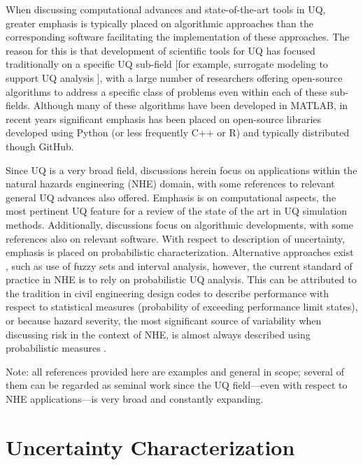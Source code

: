 When discussing computational advances and state-of-the-art tools in UQ, greater emphasis is typically placed on algorithmic approaches than the corresponding software facilitating the implementation of these approaches. The reason for this is that development of scientific tools for UQ has focused traditionally on a specific UQ sub-field [for example, surrogate modeling to support UQ analysis \citep{lophaven2002dacea, gorissen2010surrogate}], with a large number of researchers \citep[e.g.,][]{bect2017bayesian, clement2018methods} offering open-source algorithms to address a specific class of problems even within each of these sub-fields. Although many of these algorithms have been developed in MATLAB, in recent years significant emphasis has been placed on open-source libraries developed using Python (or less frequently C++ or R) and typically distributed though GitHub.    

Since UQ is a very broad field, discussions herein focus on applications within the natural hazards engineering (NHE) domain, with some references to relevant general UQ advances also offered. Emphasis is on computational aspects, the most pertinent UQ feature for a review of the state of the art in UQ simulation methods. Additionally, discussions focus on algorithmic developments, with some references also on relevant software. With respect to description of uncertainty, emphasis is placed on probabilistic characterization. Alternative approaches exist \citep{beer2013imprecise}, such as use of fuzzy sets and interval analysis, however, the current standard of practice in NHE is to rely on probabilistic UQ analysis. This can be attributed to the tradition in civil engineering design codes to describe performance with respect to statistical measures (probability of exceeding performance limit states), or because hazard severity, the most significant source of variability when discussing risk in the context of NHE, is almost always described using probabilistic measures \citep{mcguire2004seismic, resio2007white}. 

Note: all references provided here are examples and general in scope; several of them can be regarded as seminal work since the UQ field---even with respect to NHE applications---is very broad and constantly expanding.    

\section{Uncertainty Characterization}
\label{sec:uq_characterization}


